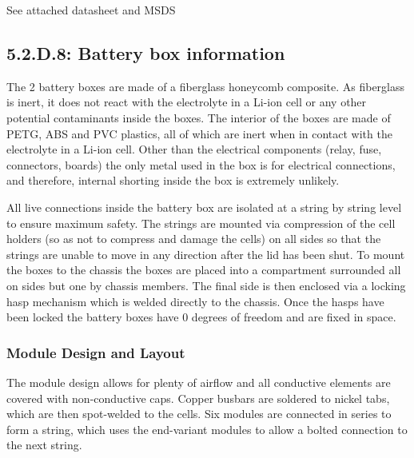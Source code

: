 \documentclass[10pt]{article}
\begin{document}
See attached datasheet and MSDS




\subsection{5.2.D.8: Battery box information}

The 2 battery boxes are made of a fiberglass honeycomb composite. As fiberglass
is inert, it does not react with the electrolyte in a Li-ion cell or any other
potential contaminants inside the boxes. The interior of the boxes are made of
PETG, ABS and PVC plastics, all of which are inert when in contact with the
electrolyte in a Li-ion cell. Other than the electrical components
(relay, fuse, connectors, boards) the only metal used in the box is for
electrical connections, and therefore, internal shorting inside the box is
extremely unlikely.

All live connections inside the battery box are isolated at a string by string
level to ensure maximum safety. The strings are mounted via compression of the
cell holders (so as not to compress and damage the cells) on all sides so that
the strings are unable to move in any direction after the lid has been shut.
To mount the boxes to the chassis the boxes are placed into a compartment
surrounded all on sides but one by chassis members. The final side is then
enclosed via a locking hasp mechanism which is welded directly to the chassis.
Once the hasps have been locked the battery boxes have 0 degrees of freedom
and are fixed in space.

\subsubsection{Module Design and Layout}

The module design allows for plenty of airflow and all conductive elements are covered with
non-conductive caps. Copper busbars are soldered to nickel tabs, which are then spot-welded to
the cells. Six modules are connected in series to form a string, which uses the end-variant
modules to allow a bolted connection to the next string.
\end{document}
